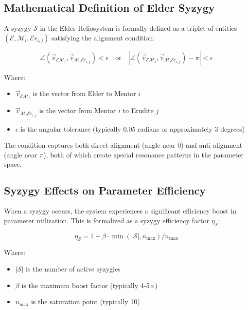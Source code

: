 \subsection{Mathematical Definition of Elder Syzygy}

A syzygy $\mathcal{S}$ in the Elder Heliosystem is formally defined as a triplet of entities $(\mathcal{E}, \mathcal{M}_i, \mathcal{E}r_{i,j})$ satisfying the alignment condition:

\begin{equation}
\angle(\vec{v}_{\mathcal{E}\mathcal{M}_i}, \vec{v}_{\mathcal{M}_i\mathcal{E}r_{i,j}}) < \epsilon \quad \text{or} \quad |\angle(\vec{v}_{\mathcal{E}\mathcal{M}_i}, \vec{v}_{\mathcal{M}_i\mathcal{E}r_{i,j}}) - \pi| < \epsilon
\end{equation}

Where:
\begin{itemize}
    \item $\vec{v}_{\mathcal{E}\mathcal{M}_i}$ is the vector from Elder to Mentor $i$
    \item $\vec{v}_{\mathcal{M}_i\mathcal{E}r_{i,j}}$ is the vector from Mentor $i$ to Erudite $j$
    \item $\epsilon$ is the angular tolerance (typically $0.05$ radians or approximately $3$ degrees)
\end{itemize}

The condition captures both direct alignment (angle near 0) and anti-alignment (angle near $\pi$), both of which create special resonance patterns in the parameter space.

\subsection{Syzygy Effects on Parameter Efficiency}

When a syzygy occurs, the system experiences a significant efficiency boost in parameter utilization. This is formalized as a syzygy efficiency factor $\eta_\mathcal{S}$:

\begin{equation}
\eta_\mathcal{S} = 1 + \beta \cdot \min(|\mathcal{S}|, n_{\text{max}}) / n_{\text{max}}
\end{equation}

Where:
\begin{itemize}
    \item $|\mathcal{S}|$ is the number of active syzygies
    \item $\beta$ is the maximum boost factor (typically 4-5×)
    \item $n_{\text{max}}$ is the saturation point (typically 10)
\end{itemize}

